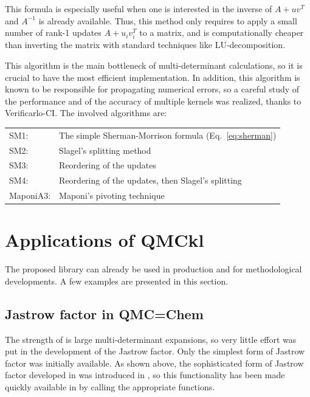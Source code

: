 This formula is especially useful when one is interested in the
inverse of $A + uv^T$ and $A^{-1}$ is already available. Thus, this 
method only requires to apply a small number of rank-1 updates $A + u_i v_i^T$
to a matrix, and is computationally cheaper than inverting the matrix
with standard techniques like LU-decomposition.

This algorithm is the main bottleneck of multi-determinant
calculations, so it is crucial to have the most efficient
implementation. In addition, this algorithm is known to be responsible
for propagating numerical errors, so a careful study of the
performance and of the accuracy of multiple kernels was realized,
thanks to Verificarlo-CI. The involved algorithms are:
\begin{center}
\begin{tabular}{ll}
  SM1:      & The simple Sherman-Morrison formula (Eq.~\eqref{eq:sherman}) \\
  SM2:      & Slagel's splitting method\cite{slagel_splitting} \\
  SM3:      & Reordering of the updates \\
  SM4:      & Reordering of the updates, then Slagel's splitting \\
  MaponiA3: & Maponi's pivoting technique\cite{maponi} \\
\end{tabular}
\end{center}



\section{Applications of QMCkl}

The proposed library can already be used in production and for
methodological developments. A few examples are presented in this section.

\subsection{Jastrow factor in QMC=Chem}

The strength of \qmcchem{} is large multi-determinant expansions, so very
little effort was put in the development of the Jastrow factor. Only the
simplest form of Jastrow factor was initially available. As shown above, the
sophisticated form of Jastrow factor developed in \champ{} was introduced
in \QMCkl{}, so this functionality has been made quickly available
in \qmcchem{} by calling the \QMCkl{} appropriate functions.

